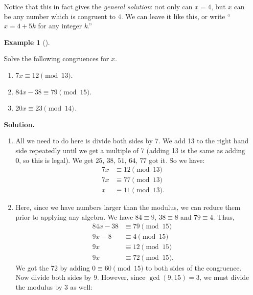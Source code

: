 \documentclass[10pt,]{book}
\theoremstyle{plain}
\theoremstyle{definition}
\newtheorem{example}[theorem]{Example}
\theoremstyle{definition}
\theoremstyle{definition}
\numberwithin{equation}{chapter}
\newcommand{\amp}{ & }
\begin{document}
Notice that this in fact gives the \emph{general solution}: not only can \(x = 4\), but \(x\) can be any number which is congruent to 4. We can leave it like this, or write ``\(x = 4 + 5k\) for any integer \(k\).''
%
\begin{example}[]\label{example-120}

Solve the following congruences for \(x\).
%
\leavevmode%
\begin{enumerate}
\item\hypertarget{li-1398}{}\(7x \equiv 12 \pmod{13}\).%
\item\hypertarget{li-1399}{}\(84x - 38 \equiv 79 \pmod{15}\).%
\item\hypertarget{li-1400}{}\(20x \equiv 23 \pmod{14}\).%
\end{enumerate}
\par\medskip\noindent%
\textbf{Solution.}\quad \leavevmode%
\begin{enumerate}
\item\hypertarget{li-1401}{}
All we need to do here is divide both sides by 7.  We add 13 to the right hand side repeatedly until we get a multiple of 7 (adding 13 is the same as adding 0, so this is legal).  We get \(25\), \(38\), \(51\), \(64\), \(77\) \textendash{} got it.  So we have:
\begin{equation*}
  \begin{aligned}7x \amp  \equiv 12 \pmod{13} \\
			7x \amp  \equiv 77 \pmod{13} \\
			x \amp  \equiv 11 \pmod{13}.
\end{aligned}
\end{equation*}
%
\item\hypertarget{li-1402}{}
Here, since we have numbers larger than the modulus, we can reduce them prior to applying any algebra.  We have \(84 \equiv 9\), \(38 \equiv 8\) and \(79 \equiv 4\).  Thus,
\begin{equation*}
  \begin{aligned}84x - 38 \amp  \equiv 79 \pmod{15} \\
		9x - 8 \amp  \equiv 4 \pmod{15} \\
		9x \amp  \equiv 12 \pmod{15} \\
		9x \amp  \equiv 72 \pmod{15}.
\end{aligned}
\end{equation*}
We got the 72 by adding \(0 \equiv 60 \pmod{15}\) to both sides of the congruence.  Now divide both sides by 9.  However, since \(\gcd(9, 15) = 3\), we must divide the modulus by 3 as well:

\end{enumerate}
\end{example}
\end{document}
